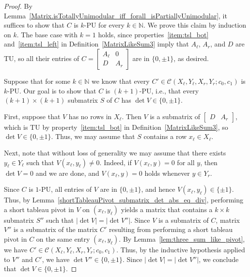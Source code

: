 \begin{proof}
    By Lemma~\ref{Matrix.isTotallyUnimodular_iff_forall_isPartiallyUnimodular}, it suffices to show that $C$ is $k$-PU for every $k \in \mathbb{N}$. We prove this claim by induction on $k$. The base case with $k = 1$ holds, since properties~\ref{item:tsl_bot} and~\ref{item:tsl_left} in Definition~\ref{MatrixLikeSum3} imply that $A_{\ell}$, $A_{r}$, and $D$ are TU, so all their entries of $C = \begin{bmatrix} A_{\ell} & 0 \\ D & A_{r} \end{bmatrix}$ are in $\{0, \pm 1\}$, as desired.

    Suppose that for some $k \in \mathbb{N}$ we know that every $C' \in \mathcal{C} (X_{\ell}, Y_{\ell}, X_{r}, Y_{r}; c_{0}, c_{1})$ is $k$-PU. Our goal is to show that $C$ is $(k + 1)$-PU, i.e., that every $(k + 1) \times (k + 1)$ submatrix $S$ of $C$ has $\det V \in \{0, \pm 1\}$.

    First, suppose that $V$ has no rows in $X_{\ell}$. Then $V$ is a submatrix of $\begin{bmatrix} D & A_{r} \end{bmatrix}$, which is TU by property~\ref{item:tsl_bot} in Definition~\ref{MatrixLikeSum3}, so $\det V \in \{0, \pm 1\}$. Thus, we may assume that $S$ contains a row $x_{\ell} \in X_{\ell}$.

    Next, note that without loss of generality we may assume that there exists $y_{\ell} \in Y_{\ell}$ such that $V (x_{\ell}, y_{\ell}) \neq 0$. Indeed, if $V (x_{\ell}, y) = 0$ for all $y$, then $\det V = 0$ and we are done, and $V (x_{\ell}, y) = 0$ holds whenever $y \in Y_{r}$.

    Since $C$ is $1$-PU, all entries of $V$ are in $\{0, \pm 1\}$, and hence $V (x_{\ell}, y_{\ell}) \in \{\pm 1\}$. Thus, by Lemma~\ref{shortTableauPivot_submatrix_det_abs_eq_div}, performing a short tableau pivot in $V$ on $(x_{\ell}, y_{\ell})$ yields a matrix that contains a $k \times k$ submatrix $S''$ such that $|\det V| = |\det V''|$. Since $V$ is a submatrix of $C$, matrix $V''$ is a submatrix of the matrix $C'$ resulting from performing a short tableau pivot in $C$ on the same entry $(x_{\ell}, y_{\ell})$. By Lemma~\ref{lem:three_sum_like_pivot}, we have $C' \in \mathcal{C} (X_{\ell}, Y_{\ell}, X_{r}, Y_{r}; c_{0}, c_{1})$. Thus, by the inductive hypothesis applied to $V''$ and $C'$, we have $\det V'' \in \{0, \pm 1\}$. Since $|\det V| = |\det V''|$, we conclude that $\det V \in \{0, \pm 1\}$.
\end{proof}

